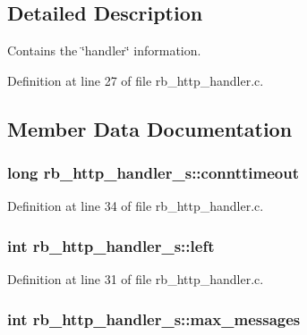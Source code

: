 \subsection{Detailed Description}
Contains the \char`\"{}handler\char`\"{} information. 

Definition at line 27 of file rb\-\_\-http\-\_\-handler.\-c.



\subsection{Member Data Documentation}
\hypertarget{structrb__http__handler__s_ae4538da6abfe51878cf87aa990105c59}{
\subsubsection[{connttimeout}]{\setlength{\rightskip}{0pt plus 5cm}long rb\-\_\-http\-\_\-handler\-\_\-s\-::connttimeout}}\label{structrb__http__handler__s_ae4538da6abfe51878cf87aa990105c59}


Definition at line 34 of file rb\-\_\-http\-\_\-handler.\-c.

\hypertarget{structrb__http__handler__s_a6239490836609d286669af640028ae71}{
\subsubsection[{left}]{\setlength{\rightskip}{0pt plus 5cm}int rb\-\_\-http\-\_\-handler\-\_\-s\-::left}}\label{structrb__http__handler__s_a6239490836609d286669af640028ae71}


Definition at line 31 of file rb\-\_\-http\-\_\-handler.\-c.

\hypertarget{structrb__http__handler__s_ac8ff888740fc0f4c4365fa08fc7d044f}{
\subsubsection[{max\-\_\-messages}]{\setlength{\rightskip}{0pt plus 5cm}int rb\-\_\-http\-\_\-handler\-\_\-s\-::max\-\_\-messages}}\label{structrb__http__handler__s_ac8ff888740fc0f4c4365fa08fc7d044f}


